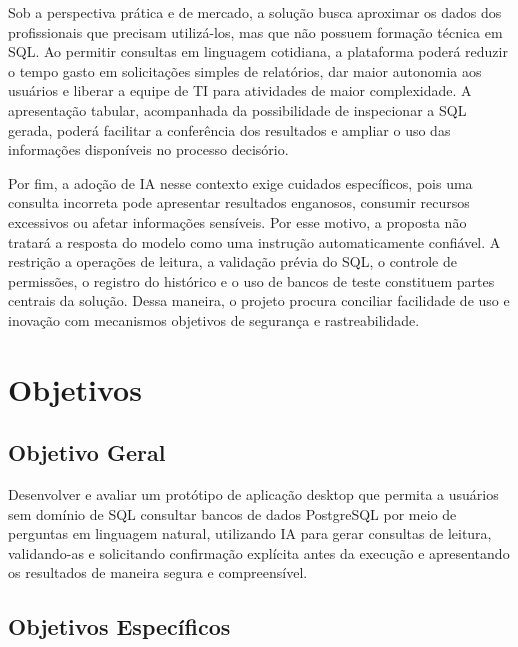 Sob a perspectiva prática e de mercado, a solução busca aproximar os dados dos profissionais que precisam utilizá-los, mas que não possuem formação técnica em SQL. Ao permitir consultas em linguagem cotidiana, a plataforma poderá reduzir o tempo gasto em solicitações simples de relatórios, dar maior autonomia aos usuários e liberar a equipe de TI para atividades de maior complexidade. A apresentação tabular, acompanhada da possibilidade de inspecionar a SQL gerada, poderá facilitar a conferência dos resultados e ampliar o uso das informações disponíveis no processo decisório.

Por fim, a adoção de IA nesse contexto exige cuidados específicos, pois uma consulta incorreta pode apresentar resultados enganosos, consumir recursos excessivos ou afetar informações sensíveis. Por esse motivo, a proposta não tratará a resposta do modelo como uma instrução automaticamente confiável. A restrição a operações de leitura, a validação prévia do SQL, o controle de permissões, o registro do histórico e o uso de bancos de teste constituem partes centrais da solução. Dessa maneira, o projeto procura conciliar facilidade de uso e inovação com mecanismos objetivos de segurança e rastreabilidade.

\section{Objetivos}

\subsection{Objetivo Geral}

Desenvolver e avaliar um protótipo de aplicação desktop que permita a usuários sem domínio de SQL consultar bancos de dados PostgreSQL por meio de perguntas em linguagem natural, utilizando IA para gerar consultas de leitura, validando-as e solicitando confirmação explícita antes da execução e apresentando os resultados de maneira segura e compreensível.

\subsection{Objetivos Específicos}


